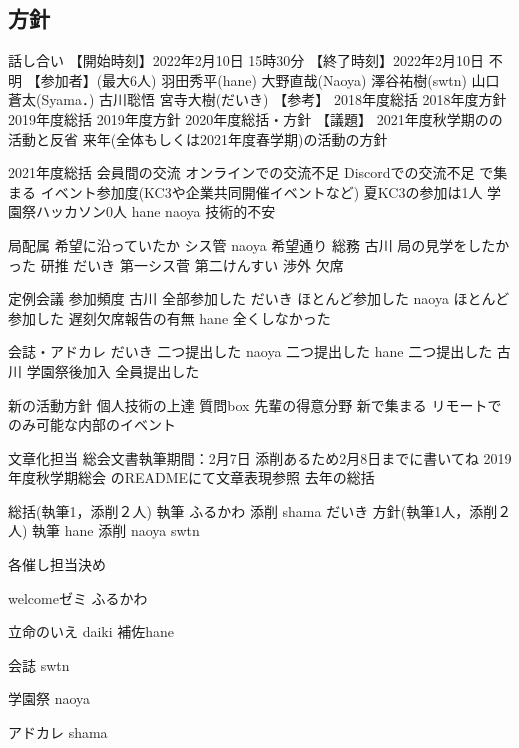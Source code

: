 \subsection*{\newGradeIfKouki{}\secondGrade{}方針}
\firstGrade{}話し合い
【開始時刻】2022年2月10日 15時30分
【終了時刻】2022年2月10日 不明
【参加者】(最大6人)
羽田秀平(hane)
大野直哉(Naoya)
澤谷祐樹(swtn)
山口蒼太(Syama．)
古川聡悟
宮寺大樹(だいき)
【参考】
2018年度総括
2018年度方針
2019年度総括
2019年度方針
2020年度総括・方針
【議題】
2021年度秋学期の\firstGrade{}の活動と反省
来年(全体もしくは2021年度春学期)の活動の方針

2021年度\firstGrade{}総括
会員間の交流 
オンラインでの交流不足
Discordでの交流不足
\firstGrade{}で集まる
イベント参加度(KC3や企業共同開催イベントなど)
夏KC3の参加は1人
学園祭ハッカソン0人
hane naoya 技術的不安

局配属
希望に沿っていたか
シス管 naoya 希望通り 
総務 古川 局の見学をしたかった
研推 だいき 第一シス菅 第二けんすい
渉外 欠席

定例会議
参加頻度
古川 全部参加した
だいき ほとんど参加した
naoya ほとんど参加した
遅刻欠席報告の有無
hane 全くしなかった


会誌・アドカレ
だいき 二つ提出した
naoya 二つ提出した
hane 二つ提出した
古川 学園祭後加入
全員提出した

新\secondGrade{}の活動方針
	個人技術の上達
	質問box
	先輩の得意分野
	新\secondGrade{}で集まる
	リモートでのみ可能な内部のイベント


文章化担当
総会文書執筆期間：2月7日
添削あるため2月8日までに書いてね
2019年度秋学期総会 のREADMEにて文章表現参照
去年の\firstGrade{}総括

総括(執筆1，添削２人)
執筆
ふるかわ
添削
shama
だいき
方針(執筆1人，添削２人)
執筆
hane
添削
naoya
swtn

各催し担当決め

welcomeゼミ  ふるかわ

立命のいえ daiki 補佐hane

会誌 swtn

学園祭 naoya

アドカレ shama




